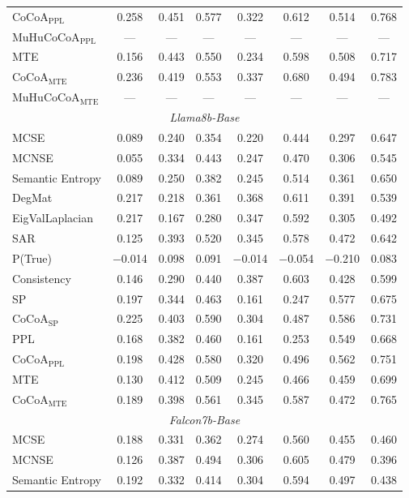 \documentclass[11pt]{article}
\newcommand{\method}{MuHuCoCoA}
\begin{document}
\begin{table}[htbp]
{\begin{tabular}{l ccccccc}
CoCoA$_{\mathrm{PPL}}$ & 0.258 & 0.451 & 0.577 & 0.322 & 0.612 & 0.514 & 0.768 \\
\method{}$_{\mathrm{PPL}}$ & --- & --- & --- & --- & --- & --- & --- \\
MTE & 0.156 & 0.443 & 0.550 & 0.234 & 0.598 & 0.508 & 0.717 \\
CoCoA$_{\mathrm{MTE}}$ & 0.236 & 0.419 & 0.553 & 0.337 & 0.680 & 0.494 & 0.783 \\
\method{}$_{\mathrm{MTE}}$ & --- & --- & --- & --- & --- & --- & --- \\
\midrule
\multicolumn{8}{c}{\textit{Llama8b-Base}} \\
\midrule
MCSE & 0.089 & 0.240 & 0.354 & 0.220 & 0.444 & 0.297 & 0.647 \\
MCNSE & 0.055 & 0.334 & 0.443 & 0.247 & 0.470 & 0.306 & 0.545 \\
Semantic Entropy & 0.089 & 0.250 & 0.382 & 0.245 & 0.514 & 0.361 & 0.650 \\
DegMat & 0.217 & 0.218 & 0.361 & 0.368 & 0.611 & 0.391 & 0.539 \\
EigValLaplacian & 0.217 & 0.167 & 0.280 & 0.347 & 0.592 & 0.305 & 0.492 \\
SAR & 0.125 & 0.393 & 0.520 & 0.345 & 0.578 & 0.472 & 0.642 \\
P(True) & $-$0.014 & 0.098 & 0.091 & $-$0.014 & $-$0.054 & $-$0.210 & 0.083 \\
Consistency & 0.146 & 0.290 & 0.440 & 0.387 & 0.603 & 0.428 & 0.599 \\
SP & 0.197 & 0.344 & 0.463 & 0.161 & 0.247 & 0.577 & 0.675 \\
CoCoA$_{\mathrm{SP}}$ & 0.225 & 0.403 & 0.590 & 0.304 & 0.487 & 0.586 & 0.731 \\
PPL & 0.168 & 0.382 & 0.460 & 0.161 & 0.253 & 0.549 & 0.668 \\
CoCoA$_{\mathrm{PPL}}$ & 0.198 & 0.428 & 0.580 & 0.320 & 0.496 & 0.562 & 0.751 \\
MTE & 0.130 & 0.412 & 0.509 & 0.245 & 0.466 & 0.459 & 0.699 \\
CoCoA$_{\mathrm{MTE}}$ & 0.189 & 0.398 & 0.561 & 0.345 & 0.587 & 0.472 & 0.765 \\
\midrule
\multicolumn{8}{c}{\textit{Falcon7b-Base}} \\
\midrule
MCSE & 0.188 & 0.331 & 0.362 & 0.274 & 0.560 & 0.455 & 0.460 \\
MCNSE & 0.126 & 0.387 & 0.494 & 0.306 & 0.605 & 0.479 & 0.396 \\
Semantic Entropy & 0.192 & 0.332 & 0.414 & 0.304 & 0.594 & 0.497 & 0.438 \\

\end{tabular}}
\end{table}
\end{document}

